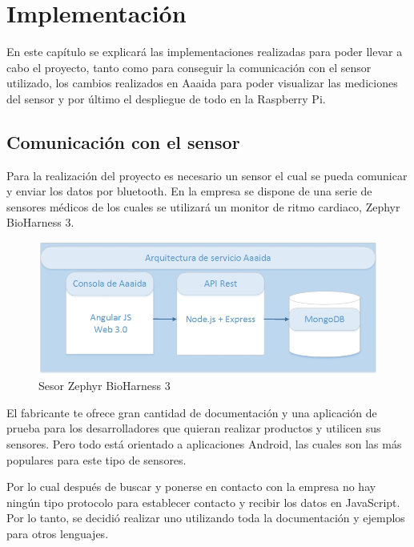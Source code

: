 \chapter{Implementación}

En este capítulo se explicará las implementaciones realizadas para poder llevar a cabo el proyecto, tanto como para conseguir la comunicación con el sensor utilizado, los cambios realizados en Aaaida para poder visualizar las mediciones del sensor y por último el despliegue de todo en la Raspberry Pi. 

\section{Comunicación con el sensor}

Para la realización del proyecto es necesario un sensor el cual se pueda comunicar y enviar los datos por bluetooth. En la empresa se dispone de una serie de sensores médicos de los cuales se utilizará un monitor de ritmo cardiaco, Zephyr BioHarness 3. 

\begin{figure}[htb]
\begin{center}
\includegraphics[width=1\textwidth]{./setup/arquitectura}
\caption{Sesor Zephyr BioHarness 3}
\end{center}
\end{figure}

El fabricante te ofrece gran cantidad de documentación y una aplicación de prueba para los desarrolladores que quieran realizar productos y utilicen sus sensores. Pero todo está orientado a aplicaciones Android, las cuales son las más populares para este tipo de sensores. 

Por lo cual después de buscar y ponerse en contacto con la empresa no hay ningún tipo protocolo para establecer contacto y recibir los datos en JavaScript. Por lo tanto, se decidió realizar uno utilizando toda la documentación y ejemplos para otros lenguajes. 

